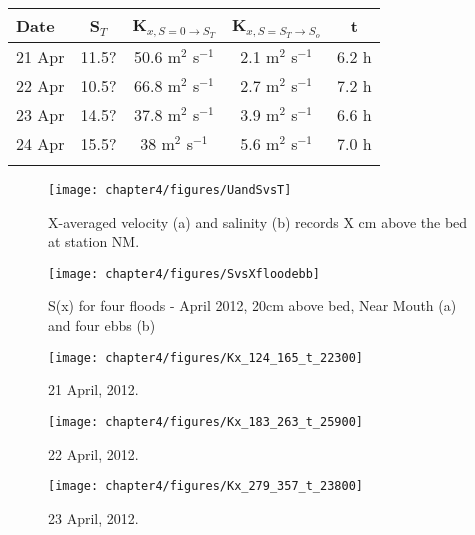 \begin{center}
\begin{tabular}{| l || c | c | c | c |}
\hline
Date & S$_{T}$ & K$_{x,S=0 \rightarrow S_T}$ &  K$_{x,S=S_T \rightarrow S_o}$ & t\\
\hline \hline
21 Apr & 11.5? & 50.6 m$^2$ s$^{-1}$ & 2.1 m$^2$ s$^{-1}$ & 6.2 h\\ 

22 Apr & 10.5? & 66.8 m$^2$ s$^{-1}$ & 2.7 m$^2$ s$^{-1}$ & 7.2 h\\ 

23 Apr & 14.5? & 37.8 m$^2$ s$^{-1}$ & 3.9 m$^2$ s$^{-1}$ & 6.6 h\\ 

24 Apr & 15.5? & 38 m$^2$ s$^{-1}$ & 5.6 m$^2$ s$^{-1}$ & 7.0 h\\ 
\hline \label{tab:Kxtable}
\end{tabular}
\end{center}






\begin{figure}
	\texttt{[image: chapter4/figures/UandSvsT]} 
\caption{X-averaged velocity (a) and salinity (b) records X cm above the bed at station NM.} \label{fig:UandSvsTch4}
\end{figure}

\begin{figure}
	\texttt{[image: chapter4/figures/SvsXfloodebb]} 
\caption{S(x) for four floods - April 2012, 20cm above bed, Near Mouth (a) and four ebbs (b)} \label{fig:SvsXall}
\end{figure}

\begin{figure}
	\texttt{[image: chapter4/figures/Kx\_124\_165\_t\_22300]} 
\caption{21 April, 2012. } \label{fig:Kx421}
\end{figure}

\begin{figure}
	\texttt{[image: chapter4/figures/Kx\_183\_263\_t\_25900]} 
\caption{22 April, 2012. } \label{fig:Kx422}
\end{figure}



\begin{figure}
	\texttt{[image: chapter4/figures/Kx\_279\_357\_t\_23800]} 
\caption{23 April, 2012. } \label{fig:Kx423}
\end{figure}




